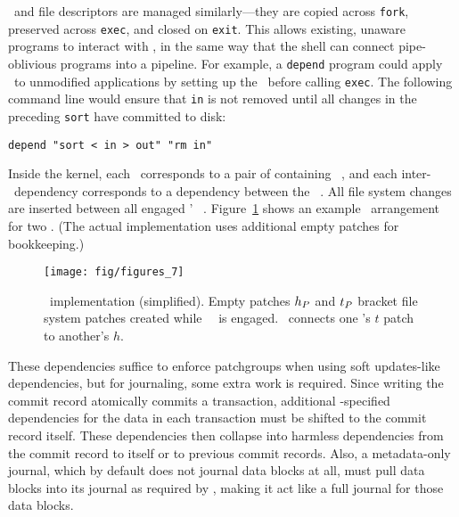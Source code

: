 \Patchgroups\ and file descriptors are managed similarly---they are copied
across \texttt{fork}, preserved across \texttt{exec}, and closed on
\texttt{exit}.
%
This allows existing, unaware programs to interact with \patchgroups,
in the same way that the shell can connect pipe-oblivious programs
into a pipeline.
%
For example, a \texttt{depend} program could apply \patchgroups\ to
unmodified applications by setting up the \patchgroups\ before calling
\texttt{exec}.  The following command line would ensure that \texttt{in} is
not removed until all changes in the preceding \texttt{sort} have committed
to disk:

\vspace{-0.5\baselineskip}
\begin{center}
\begin{small}
\verb+depend "sort < in > out" "rm in"+
\end{small}
\end{center}
\vspace{-0.5\baselineskip}


Inside the kernel, each \patchgroup\ corresponds to a pair of containing
\noop\ \patches,
and each inter-\patchgroup\ dependency corresponds to a dependency between
the \noop\ \patches.
%
All file system changes are inserted
between all engaged \patchgroups' \noop\ \patches.
%
Figure~\ref{fig:patchgroup-patches} shows an example \patch\ arrangement for
two \patchgroups.
%
(The actual implementation uses additional empty patches for bookkeeping.)

\begin{figure}[t]
\centering
\texttt{[image: fig/figures\_7]}
\caption{\Patchgroup\ implementation (simplified).  Empty
patches $h_{P}$ and $t_{P}$ bracket file system patches created while
\patchgroup\ \pgPg\ is engaged.  \pgDepend\ connects one
\patchgroup's $t$ patch to another's $h$.}
\label{fig:patchgroup-patches} 
\end{figure}

These dependencies suffice to enforce patchgroups when using soft
updates-like dependencies, but for journaling, some extra work is required.
%
Since writing the commit record atomically commits a
transaction, additional \patchgroup-specified dependencies for the data in each
transaction must be shifted to the commit record itself.
%
These dependencies then collapse into harmless dependencies from the commit
record to itself or to previous commit records.
%
Also, a metadata-only journal, which by default does not journal data
blocks at all, must pull data blocks into its journal as required by
\patchgroups, making it act like a full journal for those data blocks.

